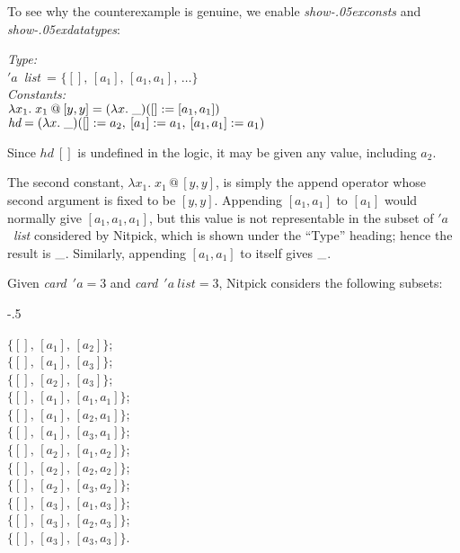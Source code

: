 \documentclass[a4paper,12pt]{article}
\def\unk{{\_}}
\def\unkef{(\lambda x.\; \unk)}
\def\unr{\ldots}
\renewcommand\_{\hbox{\textunderscore\kern-.05ex}}
\begin{document}
To see why the counterexample is genuine, we enable \textit{show\_consts}
and \textit{show\_\allowbreak datatypes}:

\prew
{\slshape Type:} \\
\hbox{}\qquad $'a$~\textit{list}~= $\{[],\, [a_1],\, [a_1, a_1],\, \unr\}$ \\
{\slshape Constants:} \\
\hbox{}\qquad $\lambda x_1.\; x_1 \mathbin{@} [y, y] = \unkef([] := [a_1, a_1])$ \\
\hbox{}\qquad $\textit{hd} = \unkef([] := a_2,\> [a_1] := a_1,\> [a_1, a_1] := a_1)$
\postw

Since $\mathit{hd}~[]$ is undefined in the logic, it may be given any value,
including $a_2$.

The second constant, $\lambda x_1.\; x_1 \mathbin{@} [y, y]$, is simply the
append operator whose second argument is fixed to be $[y, y]$. Appending $[a_1,
a_1]$ to $[a_1]$ would normally give $[a_1, a_1, a_1]$, but this value is not
representable in the subset of $'a$~\textit{list} considered by Nitpick, which
is shown under the ``Type'' heading; hence the result is $\unk$. Similarly,
appending $[a_1, a_1]$ to itself gives $\unk$.

Given \textit{card}~$'a = 3$ and \textit{card}~$'a~\textit{list} = 3$, Nitpick
considers the following subsets:

\kern-.5\smallskipamount %

\prew
\begin{multicols}{3}
$\{[],\, [a_1],\, [a_2]\}$; \\
$\{[],\, [a_1],\, [a_3]\}$; \\
$\{[],\, [a_2],\, [a_3]\}$; \\
$\{[],\, [a_1],\, [a_1, a_1]\}$; \\
$\{[],\, [a_1],\, [a_2, a_1]\}$; \\
$\{[],\, [a_1],\, [a_3, a_1]\}$; \\
$\{[],\, [a_2],\, [a_1, a_2]\}$; \\
$\{[],\, [a_2],\, [a_2, a_2]\}$; \\
$\{[],\, [a_2],\, [a_3, a_2]\}$; \\
$\{[],\, [a_3],\, [a_1, a_3]\}$; \\
$\{[],\, [a_3],\, [a_2, a_3]\}$; \\
$\{[],\, [a_3],\, [a_3, a_3]\}$.
\end{multicols}
\postw

\smallskipamount %
\end{document}
